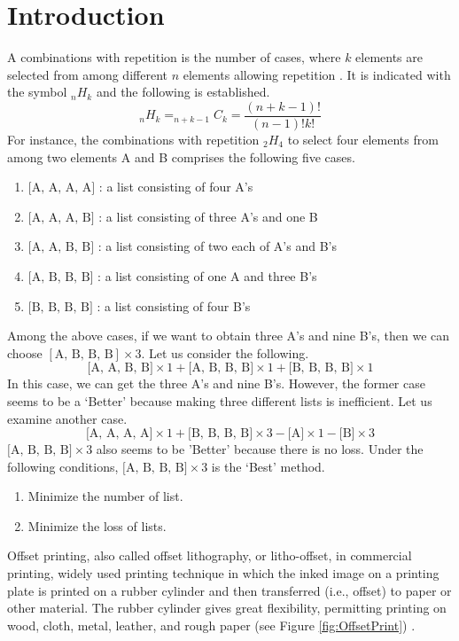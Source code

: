 \section{Introduction}\label{sec:intro}
A combinations with repetition is the number of cases, where $k$ elements are selected from among different $n$ elements allowing repetition \cite{Brualdi2004}. 
It is indicated with the symbol $_{n}H_{k}$ and the following is established.
\begin{equation}
	_{n}H_{k} = _{n+k-1}C_{k} = \frac{(n+k-1)!}{(n-1)!k!}
\end{equation}
For instance, the combinations with repetition $_{2}H_{4}$ to select four elements from among two elements A and B comprises the following five cases.
\begin{enumerate}[(1)]
	\item $\textrm{[A, A, A, A]}$ : a list consisting of four A's
	\item $\textrm{[A, A, A, B]}$ : a list consisting of three A's and one B
	\item $\textrm{[A, A, B, B]}$ : a list consisting of two each of A's and B's
	\item $\textrm{[A, B, B, B]}$ : a list consisting of one A and three B's
	\item $\textrm{[B, B, B, B]}$ : a list consisting of four B's
\end{enumerate}
Among the above cases, if we want to obtain three A's and nine B's, then we can choose $[\textrm{A, B, B, B}] \times 3$. 
Let us consider the following.
\begin{equation}
	\textrm{[A, A, B, B]} \times 1 + \textrm{[A, B, B, B]} \times 1 + \textrm{[B, B, B, B]} \times 1
\end{equation}
In this case, we can get the three A's and nine B's. 
However, the former case seems to be a ‘Better’ because making three different lists is inefficient. 
Let us examine another case.
\begin{equation}
\textrm{[A, A, A, A]} \times 1 + \textrm{[B, B, B, B]} \times 3 - \textrm{[A]} \times 1 - \textrm{[B]} \times 3
\end{equation}
$\textrm{[A, B, B, B]} \times 3$ also seems to be 'Better' because there is no loss. Under the following conditions, $\textrm{[A, B, B, B]} \times 3$ is the ‘Best’ method.
\begin{enumerate}[(1)]
	\item Minimize the number of list.
	\item Minimize the loss of lists.
\end{enumerate}
Offset printing, also called offset lithography, or litho-offset, in commercial printing, 
widely used printing technique in which the inked image on a printing plate is printed on a rubber cylinder and then transferred (i.e., offset) to paper or other material. 
The rubber cylinder gives great flexibility, permitting printing on wood, cloth, metal, leather, and rough paper (see Figure \ref{fig:OffsetPrint}) \cite{OffsetPrint}.

